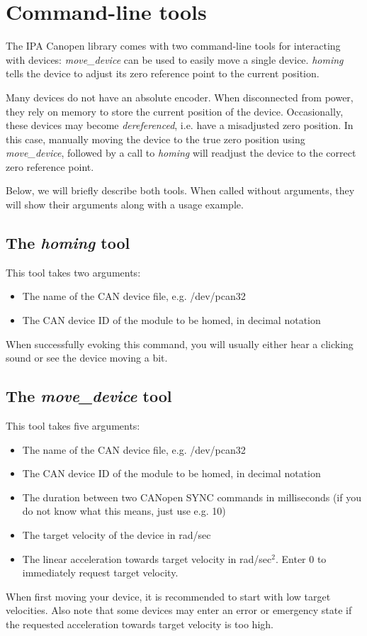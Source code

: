 \chapter{Command-line tools}
\label{chap:tools}

The IPA Canopen library comes with two command-line tools for interacting with devices: {\em move\_device} can be used to easily move a single device. {\em homing} tells the device to adjust its zero reference point to the current position.

Many devices do not have an absolute encoder. When disconnected from power, they rely on memory to store the current position of the device. Occasionally, these devices may become {\em dereferenced}, i.e. have a misadjusted zero position. In this case, manually moving the device to the true zero position using {\em move\_device}, followed by a call to {\em homing} will readjust the device to the correct zero reference point.

Below, we will briefly describe both tools. When called without arguments, they will show their arguments along with a usage example.

\section{The {\em homing} tool}

This tool takes two arguments:

\begin{itemize}
\item The name of the CAN device file, e.g. /dev/pcan32
\item The CAN device ID of the module to be homed, in decimal notation
\end{itemize}

When successfully evoking this command, you will usually either hear a clicking sound or see the device moving a bit.

\section{The {\em move\_device} tool}

This tool takes five arguments:

\begin{itemize}
\item The name of the CAN device file, e.g. /dev/pcan32
\item The CAN device ID of the module to be homed, in decimal notation
\item The duration between two CANopen SYNC commands in milliseconds (if you do not know what this means, just use e.g. 10)
\item The target velocity of the device in rad/sec
\item The linear acceleration towards target velocity in rad/sec$^2$. Enter $0$ to immediately request target velocity.
\end{itemize}

When first moving your device, it is recommended to start with low target velocities. Also note that some devices may enter an error or emergency state if the requested acceleration towards target velocity is too high.



